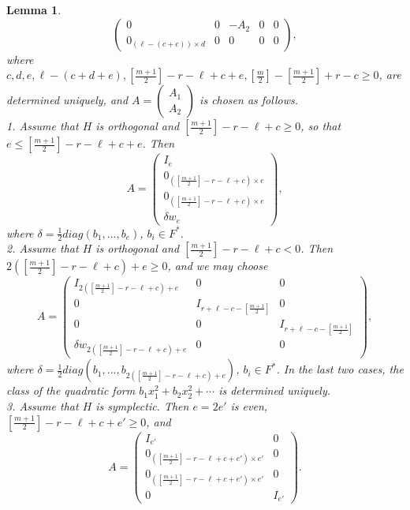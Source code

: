 \documentclass[12pts]{amsart}
\newtheorem{lem}[thm]{Lemma}
\begin{document}
\begin{lem}
\begin{equation}
\begin{pmatrix}
0&0&-A_2&0&0\\0_{(\ell-(c+e))\times d}&0&0&0&0%
\end{pmatrix},
\end{equation}
where $c,d,e,\ell-(c+d+e), [\frac{m+1}{2}]-r-\ell+c+e, [\frac{m}{2}]-[\frac{m+1}{2}]+r-c\geq 0$, are determined uniquely, and $A=\begin{pmatrix}A_1\\A_2\end{pmatrix}$ is chosen as follows.\\
1. Assume that $H$ is orthogonal and $[\frac{m+1}{2}]-r-\ell+c\geq 0$, so that $e\leq [\frac{m+1}{2}]-r-\ell+c+e$. Then
$$
A=\begin{pmatrix}I_e\\0_{([\frac{m+1}{2}]-r-\ell+c)\times e}\\0_{([\frac{m+1}{2}]-r-\ell+c)\times e}\\\delta w_e\end{pmatrix},
$$
where $\delta=\frac{1}{2}diag(b_1,...,b_e)$, $b_i\in F^*$.\\
2. Assume that $H$ is orthogonal and $[\frac{m+1}{2}]-r-\ell+c< 0$. Then $ 2([\frac{m+1}{2}]-r-\ell+c)+e\geq 0$, and we may choose
$$
A=\begin{pmatrix}I_{2([\frac{m+1}{2}]-r-\ell+c)+e}&0&0\\0&I_{r+\ell-c-[\frac{m+1}{2}]}&0\\0&0&I_{r+\ell-c-[\frac{m+1}{2}]}\\\delta w_{2([\frac{m+1}{2}]-r-\ell+c)+e}&0&0\end{pmatrix},
$$
where $\delta=\frac{1}{2}diag(b_1,...,b_{2([\frac{m+1}{2}]-r-\ell+c)+e})$, $b_i\in F^*$. In the last two cases, the class of the quadratic form $b_1x_1^2+b_2x_2^2+\cdots$ is determined uniquely. \\
3. Assume that $H$ is symplectic. Then $e=2e'$ is even, $[\frac{m+1}{2}]-r-\ell+c+e'\geq 0$, and
$$
A=\begin{pmatrix}I_{e'}&0\\0_{([\frac{m+1}{2}]-r-\ell+c+e')\times e'}&0\\0_{([\frac{m+1}{2}]-r-\ell+c+e')\times e'}&0\\0&I_{e'}\end{pmatrix}.
$$
\end{lem}
\end{document}

